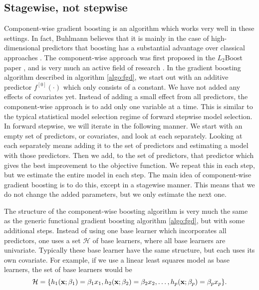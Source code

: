 \subsection{Stagewise, not stepwise}
Component-wise gradient boosting is an algorithm which works very well in these settings. In fact, Buhlmann believes that it is mainly in the case of high-dimensional predictors that boosting has a substantial advantage over classical approaches \citep{buhlmann2006}.
The component-wise approach was first proposed in the $L_2$Boost paper \citep{buhlmann-yu}, and is very much an active field of research \citep{buhlmann2006, mayr14a, mayr14b, mayr17}.
In the gradient boosting algorithm described in algorithm \eqref{algo:fgd}, we start out with an additive predictor $f^{[0]}(\cdot)$ which only consists of a constant. We have not added any effects of covariates yet. Instead of adding a small effect from all predictors, the component-wise approach is to add only one variable at a time. This is similar to the typical statistical model selection regime of forward stepwise model selection. In forward stepwise, we will iterate in the following manner. We start with an empty set of predictors, or covariates, and look at each separately. Looking at each separately means adding it to the set of predictors and estimating a model with those predictors. Then we add, to the set of predictors, that predictor which gives the best improvement to the objective function. We repeat this in each step, but we estimate the entire model in each step. The main idea of component-wise gradient boosting is to do this, except in a stagewise manner. This means that we do not change the added parameters, but we only estimate the next one.

The structure of the component-wise boosting algorithm is very much the same as the generic functional gradient boosting algorithm \eqref{algo:fgd}, but with some additional steps. Instead of using one base learner which incorporates all predictors, one uses a set $\mathcal{H}$ of base learners, where all base learners are univariate. Typically these base learner have the same structure, but each uses its own covariate. For example, if we use a linear least squares model as base learners, the set of base learners would be
\begin{equation}
    \mathcal{H}=\{h_1(\mathbf{x};\beta_1)=\beta_1 x_1,h_2(\mathbf{x};\beta_2)=\beta_2 x_2,\ldots,h_p(\mathbf{x};\beta_p)=\beta_p x_p \}.
\end{equation}


